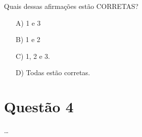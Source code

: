\documentclass[a4paper, 12pt, openright, oneside, english, brazil, article]{abntex2}
\begin{document}
	Quais dessas afirmações estão CORRETAS?
	
	\begin{enumerate}
		\item [A)] 1 e 3
		\item [B)] 1 e 2
		\item [C)] 1, 2 e 3.
		\item [D)] Todas estão corretas.
	\end{enumerate}
	
	\section{Questão 4}
	\ldots

	
\end{document}
